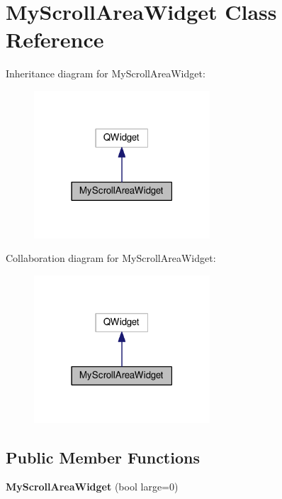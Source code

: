 \hypertarget{class_my_scroll_area_widget}{}\section{My\+Scroll\+Area\+Widget Class Reference}
\label{class_my_scroll_area_widget}


Inheritance diagram for My\+Scroll\+Area\+Widget\+:
\nopagebreak
\begin{figure}[H]
\begin{center}
\leavevmode
\includegraphics[width=186pt]{class_my_scroll_area_widget__inherit__graph}
\end{center}
\end{figure}


Collaboration diagram for My\+Scroll\+Area\+Widget\+:
\nopagebreak
\begin{figure}[H]
\begin{center}
\leavevmode
\includegraphics[width=186pt]{class_my_scroll_area_widget__coll__graph}
\end{center}
\end{figure}
\subsection*{Public Member Functions}
\begin{DoxyCompactItemize}
\item 
{\bfseries My\+Scroll\+Area\+Widget} (bool large=0)\hypertarget{class_my_scroll_area_widget_a9459c68b3c93da2efc4e3bbe5357a8fc}{}\label{class_my_scroll_area_widget_a9459c68b3c93da2efc4e3bbe5357a8fc}

\end{DoxyCompactItemize}
